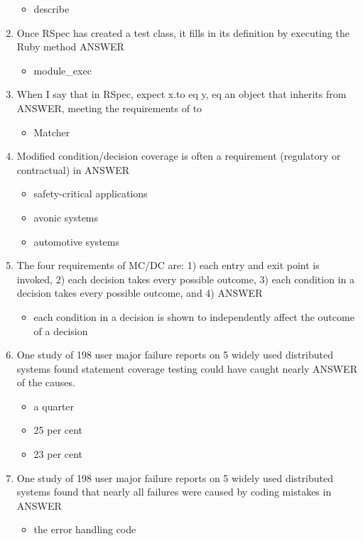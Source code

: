\documentclass{exam}
\begin{document}
\begin{enumerate}
\begin{itemize}
\item describe
\end{itemize}
\item Once RSpec has created a test class, it fills in its definition by executing the Ruby method ANSWER
\begin{itemize}
\item module\_exec
\end{itemize}
\item When I say that in RSpec, expect x.to eq y, eq an object that inherits from ANSWER, meeting the requirements of to
\begin{itemize}
\item Matcher
\end{itemize}
\item Modified condition/decision coverage is often a requirement (regulatory or contractual) in ANSWER
\begin{itemize}
\item safety-critical applications
\item avonic systems
\item automotive systems
\end{itemize}
\item The four requirements of MC/DC are: 1) each entry and exit point is invoked, 2) each decision takes every possible outcome, 3) each condition in a decision takes every possible outcome, and 4) ANSWER
\begin{itemize}
\item each condition in a decision is shown to independently affect the outcome of a decision
\end{itemize}
\item One study of 198 user major failure reports on 5 widely used distributed systems found statement coverage testing could have caught nearly ANSWER of the causes.
\begin{itemize}
\item a quarter
\item 25 per cent
\item 23 per cent
\end{itemize}
\item One study of 198 user major failure reports on 5 widely used distributed systems found that nearly all failures were caused by coding mistakes in ANSWER
\begin{itemize}
\item the error handling code
\end{itemize}

\end{enumerate}
\end{document}
